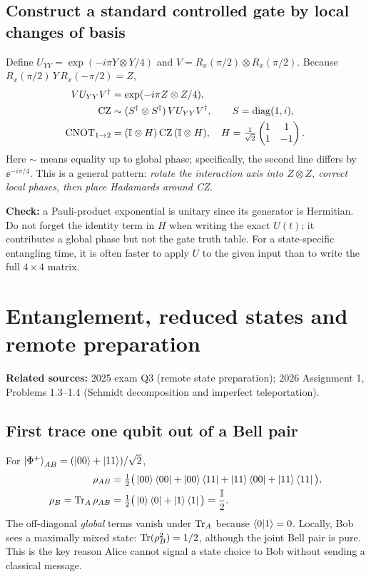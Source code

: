 \subsection{Construct a standard controlled gate by local changes of basis}
Define $U_{YY}=\exp(-i\pi Y\otimes Y/4)$ and $V=R_x(\pi/2)\otimes R_x(\pi/2)$. Because $R_x(\pi/2)\,Y\,R_x(-\pi/2)=Z$,
\begin{align}
V U_{YY}V^\dagger &=\exp(-i\pi Z\otimes Z/4),\\
\mathrm{CZ}&\sim (S^\dagger\otimes S^\dagger)\,V U_{YY}V^\dagger,
\qquad S=\operatorname{diag}(1,i),\label{eq:yyCZ}\\
\mathrm{CNOT}_{1\to2}&=(\mathbb{I}\otimes H)\,\mathrm{CZ}\,(\mathbb{I}\otimes H),
\quad H=\tfrac1{\sqrt2}\begin{pmatrix}1&1\\1&-1\end{pmatrix}.
\end{align}
Here $\sim$ means equality up to global phase; specifically, the second line differs by $\ee^{-i\pi/4}$. This is a general pattern: \emph{rotate the interaction axis into $Z\otimes Z$, correct local phases, then place Hadamards around CZ.}
\begin{examtip}
\textbf{Check:} a Pauli-product exponential is unitary since its generator is Hermitian. Do not forget the identity term in $H$ when writing the exact $U(t)$; it contributes a global phase but not the gate truth table. For a state-specific entangling time, it is often faster to apply $U$ to the given input than to write the full $4\times4$ matrix.
\end{examtip}

\section{Entanglement, reduced states and remote preparation}\label{sec:rsp}
\textbf{Related sources:} 2025 exam Q3 (remote state preparation); 2026 Assignment 1, Problems 1.3--1.4 (Schmidt decomposition and imperfect teleportation).

\subsection{First trace one qubit out of a Bell pair}
For $\left\lvert \Phi^+\right\rangle_{AB}=(\left\lvert 00\right\rangle+\left\lvert 11\right\rangle)/\sqrt2$,
\begin{align}
\rho_{AB}&=\tfrac12\big(\left\lvert 00\right\rangle\left\langle 00\right\rvert+\left\lvert 00\right\rangle\left\langle 11\right\rvert+\left\lvert 11\right\rangle\left\langle 00\right\rvert+\left\lvert 11\right\rangle\left\langle 11\right\rvert\big),\\
\rho_B=\operatorname{Tr}_A\rho_{AB}&=\tfrac12\big(\left\lvert 0\right\rangle\left\langle 0\right\rvert+\left\lvert 1\right\rangle\left\langle 1\right\rvert\big)=\frac{\mathbb{I}}2.
\end{align}
The off-diagonal \emph{global} terms vanish under $\operatorname{Tr}_A$ because $\left\langle 0\middle\vert 1\right\rangle=0$. Locally, Bob sees a maximally mixed state: $\operatorname{Tr}(\rho_B^2)=1/2$, although the joint Bell pair is pure. This is the key reason Alice cannot signal a state choice to Bob without sending a classical message.

